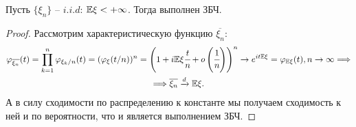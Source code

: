 \begin{theorem}
    Пусть $\{\xi_n\}$ -- $i.i.d$: $\mathbb{E} \xi < +\infty$. Тогда выполнен ЗБЧ.
\end{theorem}
\begin{proof}
    Рассмотрим характеристическую функцию $\overline{\xi_n}$:
    \begin{multline*}
        \varphi_{\overline{\xi_n}}(t) = \prod\limits_{k = 1}^{n} \varphi_{\xi_k/n}(t) = (\varphi_{\xi}(t/n))^n = \left(1 + i \mathbb{E} \xi \cfrac{t}{n} + o\left(\cfrac{1}{n}\right)\right)^n \rightarrow e^{it \mathbb{E} \xi} = \varphi_{\mathbb{E} \xi} (t), n \rightarrow \infty \Longrightarrow \\
        \Longrightarrow \overline{\xi_n} \xrightarrow{d} \mathbb{E} \xi.
    \end{multline*}
    А в силу сходимости по распределению к константе мы получаем сходимость к ней и по вероятности, что и является выполнением ЗБЧ.
\end{proof}
